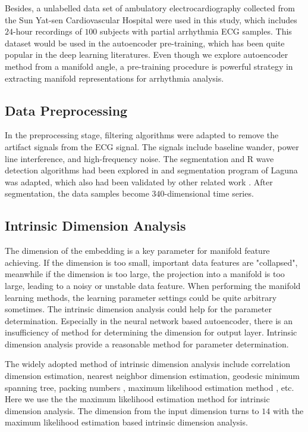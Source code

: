 \documentclass[journal]{IEEEtran}
\begin{document}
Besides, a unlabelled data set of ambulatory electrocardiography collected from the Sun Yat-sen Cardiovascular Hospital were used in this study, which includes $24$-hour recordings of $100$ subjects with partial arrhythmia ECG samples. 
This dataset would be used in the autoencoder pre-training, which has been quite popular in the deep learning literatures.
Even though we explore autoencoder method from a manifold angle, a pre-training procedure is powerful strategy in extracting manifold representations for arrhythmia analysis.




%
%
\subsection{Data Preprocessing}
In the preprocessing stage, filtering algorithms were adapted to remove the artifact signals from the ECG signal. 
The signals include baseline wander, power line interference, and high-frequency noise. 
The segmentation and R wave detection algorithms had been explored in \cite{afonso} and segmentation program of Laguna \cite{sornmo2006electrocardiogram} was adapted, which also had been validated by other related work \cite{chaza}. 
After segmentation, the data samples become $340$-dimensional time series.



%
%
\subsection{Intrinsic Dimension Analysis}
The dimension of the embedding is a key parameter for manifold feature achieving.  
If the dimension is too small, important data features are "collapsed", meanwhile if the dimension is too large, the projection into a manifold is too large, leading to a noisy or unstable data feature.
When performing the manifold learning methods, the learning parameter settings could be quite arbitrary sometimes.
The intrinsic dimension analysis could help for the parameter determination.
Especially in the neural network based autoencoder, there is an insufficiency of method for determining the dimension for output layer.
Intrinsic dimension analysis provide a reasonable method for parameter determination.

The widely adopted method of intrinsic dimension analysis include correlation dimension estimation, nearest neighbor dimension estimation\cite{costa2005estimating}, geodesic minimum spanning tree\cite{costa2004geodesic}, packing numbers \cite{kegl2003intrinsic}, maximum likelihood estimation method \cite{levina2005maximum}, etc.
Here we use the the maximum likelihood estimation method for intrinsic dimension analysis.
The dimension from the input dimension turns to $14$ with the maximum likelihood estimation based intrinsic dimension analysis.
\end{document}
